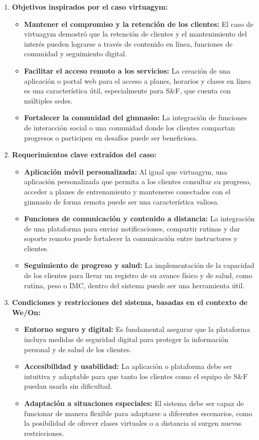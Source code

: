 \begin{enumerate}
    \item \textbf{Objetivos inspirados por el caso virtuagym:}
    \begin{itemize}
        \item \textbf{Mantener el compromiso y la retención de los clientes:} El caso de virtuagym demostró que la retención de clientes y el mantenimiento del interés pueden lograrse a través de contenido en línea, funciones de comunidad y seguimiento digital.
        \item \textbf{Facilitar el acceso remoto a los servicios:} La creación de una aplicación o portal web para el acceso a planes, horarios y clases en línea es una característica útil, especialmente para S\&F, que cuenta con múltiples sedes.
        \item \textbf{Fortalecer la comunidad del gimnasio:} La integración de funciones de interacción social o una comunidad donde los clientes compartan progresos o participen en desafíos puede ser beneficiosa.
    \end{itemize}
    \item \textbf{Requerimientos clave extraídos del caso:}
    \begin{itemize}
        \item \textbf{Aplicación móvil personalizada:} Al igual que virtuagym, una aplicación personalizada que permita a los clientes consultar su progreso, acceder a planes de entrenamiento y mantenerse conectados con el gimnasio de forma remota puede ser una característica valiosa.
        \item \textbf{Funciones de comunicación y contenido a distancia:} La integración de una plataforma para enviar notificaciones, compartir rutinas y dar soporte remoto puede fortalecer la comunicación entre instructores y clientes.
        \item \textbf{Seguimiento de progreso y salud:} La implementación de la capacidad de los clientes para llevar un registro de su avance físico y de salud, como rutina, peso o IMC, dentro del sistema puede ser una herramienta útil.
    \end{itemize}
    \item \textbf{Condiciones y restricciones del sistema, basadas en el contexto de \\ We/On:}
    \begin{itemize}
        \item \textbf{Entorno seguro y digital:} Es fundamental asegurar que la plataforma incluya medidas de seguridad digital para proteger la información personal y de salud de los clientes.
        \item \textbf{Accesibilidad y usabilidad:} La aplicación o plataforma debe ser intuitiva y adaptable para que tanto los clientes como el equipo de S\&F puedan usarla sin dificultad.
        \item \textbf{Adaptación a situaciones especiales:} El sistema debe ser capaz de funcionar de manera flexible para adaptarse a diferentes escenarios, como la posibilidad de ofrecer clases virtuales o a distancia si surgen nuevas restricciones.
    \end{itemize}
\end{enumerate}

